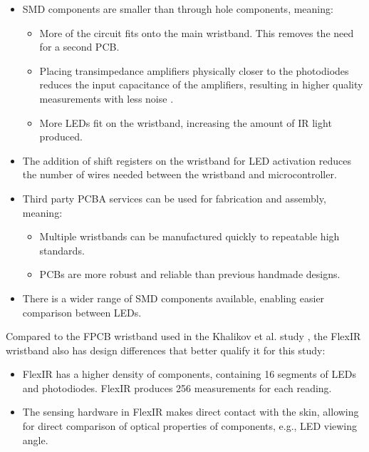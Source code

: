 \documentclass[ oneside,%
                    author={Jack Jarvis},
                    degree={BSc},
                     title={FlexIR: Flexible PCB Wristbands for Infrared Based Gesture Recognition},
                    unit={COMS30045},
                    subtitle={Investigating the Effect of LED Viewing Angle on Gesture Classification in Infrared Sensing Systems}]{dissertation}
\begin{document}
\begin{itemize}
    \item SMD components are smaller than through hole components, meaning:
    \begin{itemize}
        \item More of the circuit fits onto the main wristband. This removes the need for a second PCB.
        \item Placing transimpedance amplifiers physically closer to the photodiodes reduces the input capacitance of the amplifiers, resulting in higher quality measurements with less noise \cite{Horowitz2015TheEdition}.
        \item More LEDs fit on the wristband, increasing the amount of IR light produced.
    \end{itemize}
    \item The addition of shift registers on the wristband for LED activation reduces the number of wires needed between the wristband and microcontroller.
    \item Third party PCBA services can be used for fabrication and assembly, meaning:
    \begin{itemize}
        \item Multiple wristbands can be manufactured quickly to repeatable high standards.
        \item PCBs are more robust and reliable than previous handmade designs.
    \end{itemize}
    \item There is a wider range of SMD components available, enabling easier comparison between LEDs.
\end{itemize}

Compared to the FPCB wristband used in the Khalikov et al. study \cite{Khalikov2026WearableControl}, the FlexIR wristband also has design differences that better qualify it for this study:
\begin{itemize}
    \item FlexIR has a higher density of components, containing 16 segments of LEDs and photodiodes. FlexIR produces 256 measurements for each reading.
    \item The sensing hardware in FlexIR makes direct contact with the skin, allowing for direct comparison of optical properties of components, e.g., LED viewing angle.
\end{itemize}
\end{document}
